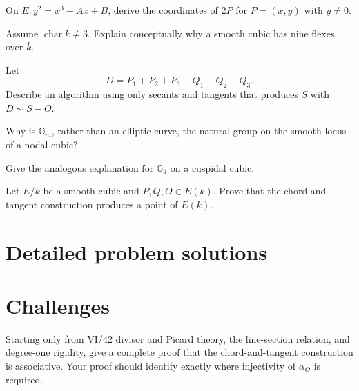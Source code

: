 \begin{problem}\label{prob:vi43-07}
On \(E:y^2=x^3+Ax+B\), derive the coordinates of \(2P\) for \(P=(x,y)\) with \(y\neq0\).
\end{problem}

\begin{problem}\label{prob:vi43-08}
Assume \(\operatorname{char}k\neq3\).  Explain conceptually why a smooth cubic has nine flexes over \(\bar k\).
\end{problem}

\begin{problem}\label{prob:vi43-09}
Let
\[
  D=P_1+P_2+P_3-Q_1-Q_2-Q_3.
\]
Describe an algorithm using only secants and tangents that produces \(S\) with \(D\sim S-O\).
\end{problem}

\begin{problem}\label{prob:vi43-10}
Why is \(\mathbb G_m\), rather than an elliptic curve, the natural group on the smooth locus of a nodal cubic?
\end{problem}

\begin{problem}\label{prob:vi43-11}
Give the analogous explanation for \(\mathbb G_a\) on a cuspidal cubic.
\end{problem}

\begin{problem}\label{prob:vi43-12}
Let \(E/k\) be a smooth cubic and \(P,Q,O\in E(k)\).  Prove that the chord-and-tangent construction produces a point of \(E(k)\).
\end{problem}

\ifdefined\FullProblemDossiers
\section{Detailed problem solutions}

\fi

\section{Challenges}

\begin{problem}\label{chal:vi43-01}
Starting only from VI/42 divisor and Picard theory, the line-section relation, and degree-one rigidity, give a complete proof that the chord-and-tangent construction is associative.  Your proof should identify exactly where injectivity of \(\alpha_O\) is required.
\end{problem}

